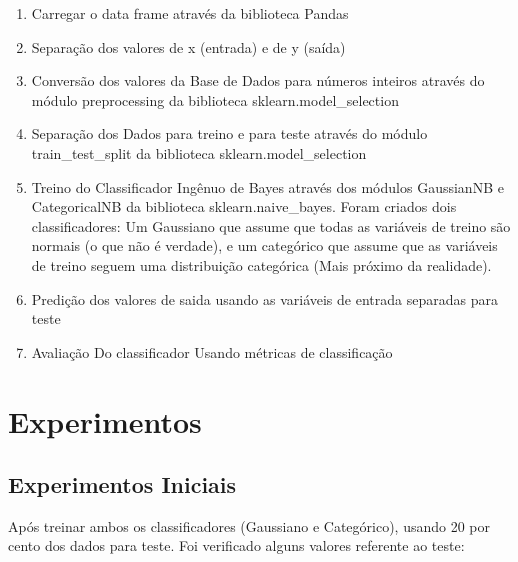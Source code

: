\documentclass[conference]{IEEEtran}
\begin{document}
\begin{enumerate}
\item Carregar o data frame através da biblioteca Pandas
\item Separação dos valores de x (entrada) e de y (saída)
\item Conversão dos valores da Base de Dados para números inteiros através do módulo preprocessing da biblioteca sklearn.model\_selection
\item Separação dos Dados para treino e para teste através do módulo train\_test\_split da biblioteca sklearn.model\_selection
\item Treino do Classificador Ingênuo de Bayes através dos módulos GaussianNB e CategoricalNB da biblioteca sklearn.naive\_bayes. Foram criados dois classificadores: Um Gaussiano que assume que todas as variáveis de treino são normais (o que não é verdade), e um categórico que assume que as variáveis de treino seguem uma distribuição categórica (Mais próximo da realidade).
\item Predição dos valores de saida usando as variáveis de entrada separadas para teste
\item Avaliação Do classificador Usando métricas de classificação
\end{enumerate}

\section{Experimentos}

\subsection{Experimentos Iniciais}
Após treinar ambos os classificadores (Gaussiano e Categórico), usando 20 por cento dos dados para teste. Foi verificado alguns valores referente ao teste:
\end{document}
